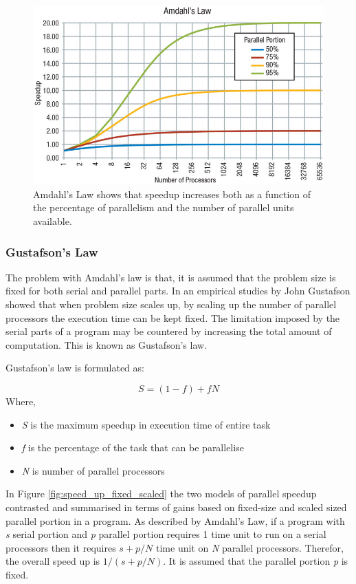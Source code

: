 \begin{figure}[!h]
\centering
  \includegraphics[width=.8\linewidth]{figs/amdahls_law.jpg}
  \caption{Amdahl's Law shows that speedup increases both as a function of the percentage of parallelism and the number of parallel units available. \citep{rtc_amdals:online}}
  \label{fig:amdahls_law}
\end{figure}

\subsubsection{Gustafson's Law}
The problem with Amdahl's law is that, it is assumed that the problem size is fixed for both serial and parallel parts. In an empirical studies by John Gustafson \citep{gustafson:88} showed that when problem size scales up, by scaling up the number of parallel processors the execution time can be kept fixed. The limitation imposed by the serial parts of a program may be countered by increasing the total amount of computation. This is known as Gustafson's law.

Gustafson's law is formulated as:

\[	S = (1 - f) + fN  \]
Where, 
\begin{itemize}
\item \textit{S} is the maximum speedup in execution time of entire task
\item \textit{f} is the percentage of the task that can be parallelise
\item \textit{N} is number of parallel processors 
\end{itemize}

In Figure \ref{fig:speed_up_fixed_scaled} the two models of parallel speedup contrasted and summarised in terms of gains based on fixed-size and scaled sized parallel portion in a program. As described by Amdahl's Law, if a program with \textit{s} serial portion and \textit{p}  parallel portion requires 1 time unit to run on a serial processors then it requires  $ s + p/N$ time unit on \textit{N} parallel processors. Therefor, the overall speed up is $ 1/(s+p/N)$. It is assumed that the parallel portion \textit{p} is fixed. 

